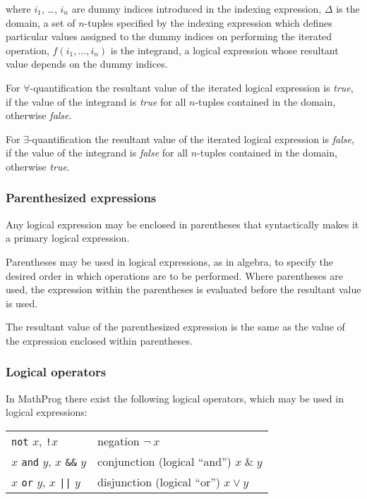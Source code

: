 \documentclass[10pt]{article}
\begin{document}
\noindent where $i_1$, \dots, $i_n$ are dummy indices introduced in
the indexing expression, $\Delta$ is the domain, a set of $n$-tuples
specified by the indexing expression which defines particular values
assigned to the dummy indices on performing the iterated operation,
$f(i_1,\dots,i_n)$ is the integrand, a logical expression whose
resultant value depends on the dummy indices.

For $\forall$-quantification the resultant value of the iterated
logical expression is {\it true}, if the value of the integrand is
{\it true} for all $n$-tuples contained in the domain, otherwise
{\it false}.

For $\exists$-quantification the resultant value of the iterated
logical expression is {\it false}, if the value of the integrand is
{\it false} for all $n$-tuples contained in the domain, otherwise
{\it true}.

\subsubsection{Parenthesized expressions}

Any logical expression may be enclosed in parentheses that
syntactically makes it a primary logical expression.

Parentheses may be used in logical expressions, as in algebra, to
specify the desired order in which operations are to be performed.
Where parentheses are used, the expression within the parentheses is
evaluated before the resultant value is used.

The resultant value of the parenthesized expression is the same as the
value of the expression enclosed within parentheses.

\subsubsection{Logical operators}

In MathProg there exist the following logical operators, which may be
used in logical expressions:

\medskip

\begin{tabular}{@{}p{96pt}p{222pt}@{}}
{\tt not} $x$, {\tt!}$x$&negation $\neg\ x$\\
$x$ {\tt and} $y$, $x$ {\tt\&\&} $y$&conjunction (logical ``and'')
$x\;\&\;y$\\
$x$ {\tt or} $y$, $x$ {\tt||} $y$&disjunction (logical ``or'')
$x\vee y$\\
\end{tabular}
\end{document}
